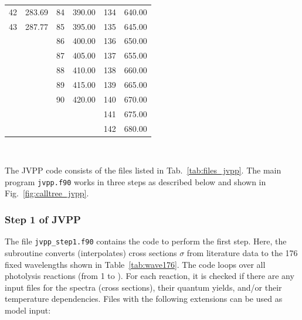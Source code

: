 \documentclass[a4paper,twoside]{article}
\newcommand{\IT}[1]{#1\index{#1}}
\begin{document}
\begin{table}[tbh]
\begin{center}
\begin{tabular}{|rp{}|rp{}|rp{}|}
       42 & 283.69                                &  84 & 390.00                      & 134 & 640.00                          \\
       43 & 287.77                                &  85 & 395.00                      & 135 & 645.00                          \\\cline{1-2}
          &                                       &  86 & 400.00                      & 136 & 650.00                          \\
          &                                       &  87 & 405.00                      & 137 & 655.00                          \\
          &                                       &  88 & 410.00                      & 138 & 660.00                          \\
          &                                       &  89 & 415.00                      & 139 & 665.00                          \\
          &                                       &  90 & 420.00                      & 140 & 670.00                          \\\cline{3-4}
          &                                       &     &                             & 141 & 675.00                          \\
          &                                       &     &                             & 142 & 680.00                          \\
      \hline
    \end{tabular}\\[1cm]
  \end{center}
\end{table}

The \IT{JVPP} code consists of the files listed in Tab.~\ref{tab:files_jvpp}.
The main program \verb|jvpp.f90| works in three steps as described below
and shown in Fig.~\ref{fig:calltree_jvpp}.

\subsubsection{Step 1 of \IT{JVPP}}

The file \verb|jvpp_step1.f90| contains the code to perform the first
step. Here, the subroutine  converts (interpolates)
cross sections $\sigma$ from literature data to the 176 fixed
wavelengths shown in Table~\ref{tab:wave176}. The code loops over all
photolysis reactions (from 1 to ). For each reaction, it is
checked if there are any input files for the spectra (cross sections),
their quantum yields, and/or their temperature dependencies. Files with
the following extensions can be used as model input:
\end{document}
